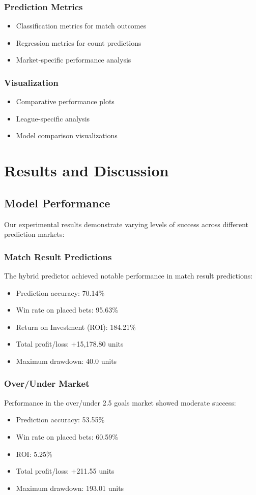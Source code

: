 \documentclass[conference]{IEEEtran}
\begin{document}
\subsubsection{Prediction Metrics}
\begin{itemize}
\item Classification metrics for match outcomes
\item Regression metrics for count predictions
\item Market-specific performance analysis
\end{itemize}

\subsubsection{Visualization}
\begin{itemize}
\item Comparative performance plots
\item League-specific analysis
\item Model comparison visualizations
\end{itemize}

\section{Results and Discussion}
\subsection{Model Performance}
Our experimental results demonstrate varying levels of success across different prediction markets:

\subsubsection{Match Result Predictions}
The hybrid predictor achieved notable performance in match result predictions:
\begin{itemize}
\item Prediction accuracy: 70.14\%
\item Win rate on placed bets: 95.63\%
\item Return on Investment (ROI): 184.21\%
\item Total profit/loss: +15,178.80 units
\item Maximum drawdown: 40.0 units
\end{itemize}

\subsubsection{Over/Under Market}
Performance in the over/under 2.5 goals market showed moderate success:
\begin{itemize}
\item Prediction accuracy: 53.55\%
\item Win rate on placed bets: 60.59\%
\item ROI: 5.25\%
\item Total profit/loss: +211.55 units
\item Maximum drawdown: 193.01 units
\end{itemize}
\end{document}
